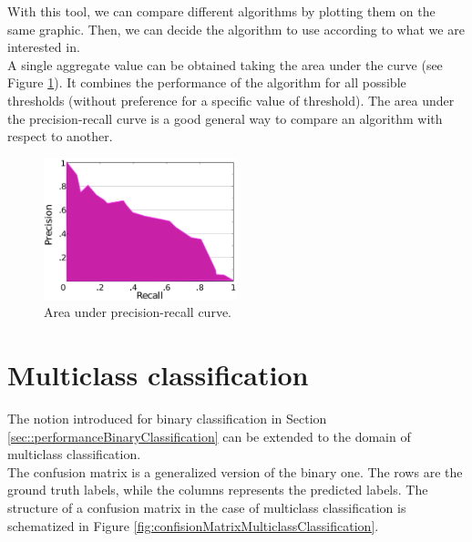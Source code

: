 With this tool, we can compare different algorithms by plotting them on the same graphic. Then, we can decide the algorithm to use according to what we are interested in.\\
A single aggregate value can be obtained taking the area under the curve (see Figure \ref{fig:areaUnderPreRecCurve}). It combines the performance of the algorithm for all possible thresholds (without preference for a specific value of threshold). The area under the precision-recall curve is a good general way to compare an algorithm with respect to another.

\begin{figure}
    \centering
    \includegraphics[width=0.5\textwidth]{images/areaUnderPreRecCurve.png}
    \caption{Area under precision-recall curve.}
    \label{fig:areaUnderPreRecCurve}
\end{figure}

\section{Multiclass classification}
\label{sec::performanceMulticlassClassification}
The notion introduced for binary classification in Section \ref{sec::performanceBinaryClassification} can be extended to the domain of multiclass classification.\\
The confusion matrix is a generalized version of the binary one. The rows are the ground truth labels, while the columns represents the predicted labels. The structure of a confusion matrix in the case of multiclass classification is schematized in Figure \ref{fig:confisionMatrixMulticlassClassification}.

